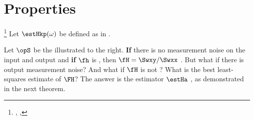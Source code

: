\section{Properties}
\begin{proposition}
\footnote{
  ,
  ,
  }
\label{prop:Hkappa}
Let $\estHkp(\omega)$ be defined as in .
\end{proposition}

\begin{minipage}{\tw-50mm}
Let $\opS$ be the  illustrated to the right.
\textbf{If} there is no measurement noise on the input and output and \textbf{if}
$\fh$ is , then
$\fH = \Swxy/\Swxx$ .
But what if there is output measurement noise?
And what if $\fH$ is not ?
What is the best least-squares estimate of $\FH$?
The answer is the estimator $\estHa$ ,
as demonstrated in the next theorem.
\end{minipage}
\hfill{}


